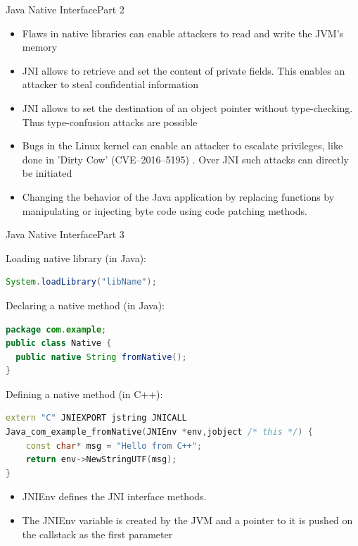 \begin{frame}{Java Native Interface}{Part 2}
    \begin{itemize}
    \item Flaws in native libraries can enable attackers to read and write the JVM's memory \cite[p. 3]{Sun_jvm-portablesandboxing}
    \item JNI allows to retrieve and set the content of private fields. This enables an attacker to steal confidential information \cite[p. 3]{Sun_jvm-portablesandboxing}
    \item JNI allows to set the destination of an object pointer without type-checking. Thus type-confusion attacks are possible \cite[p. 4]{Sun_jvm-portablesandboxing}
    \item Bugs in the Linux kernel can enable an attacker to escalate privileges, like done in 'Dirty Cow' (CVE--2016--5195) \cite{DirtyCow}. Over JNI such attacks can directly be initiated
    \item Changing the behavior of the Java application by replacing functions by manipulating or injecting byte code using code patching methods.
    \end{itemize}
\end{frame}



\begin{frame}[fragile]{Java Native Interface}{Part 3}

Loading native library (in Java):
\begin{lstlisting}[language=Java, style=JavaCodeStyle]
 System.loadLibrary("libName");
\end{lstlisting}

Declaring a native method (in Java):
\begin{lstlisting}[language=Java, style=JavaCodeStyle]
package com.example;
public class Native {
  public native String fromNative();
}
\end{lstlisting}

Defining a native method (in C++):
\begin{lstlisting}[language=C++, style=CppCodeStyle]
extern "C" JNIEXPORT jstring JNICALL
Java_com_example_fromNative(JNIEnv *env,jobject /* this */) {
    const char* msg = "Hello from C++";
    return env->NewStringUTF(msg);
}
\end{lstlisting}

\begin{itemize}
    \item JNIEnv defines the JNI interface methods.
    \item The JNIEnv variable is created by the JVM and a pointer to it is pushed on the callstack as the first parameter
    \end{itemize}

\end{frame}



